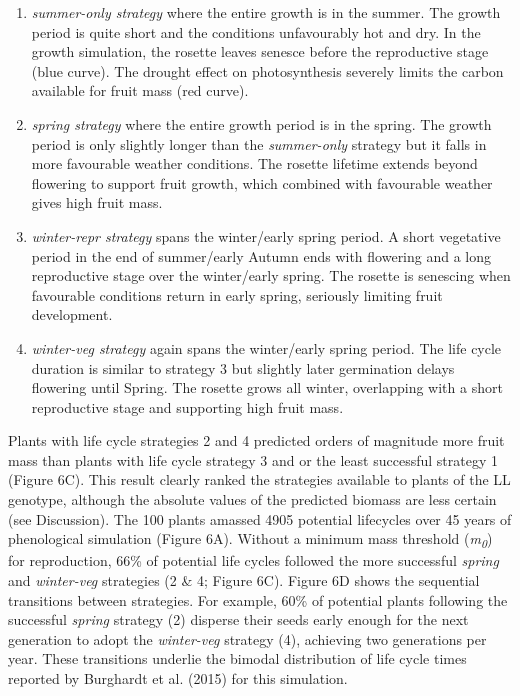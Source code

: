 \documentclass[phd]{infthesis}
\begin{document}
\begin{enumerate}
\def\labelenumi{\arabic{enumi}.}
\item
  \emph{summer-only strategy} where the entire growth is in the summer.
  The growth period is quite short and the conditions unfavourably hot
  and dry. In the growth simulation, the rosette leaves senesce before
  the reproductive stage (blue curve). The drought effect on
  photosynthesis severely limits the carbon available for fruit mass
  (red curve).
\item
  \emph{spring strategy} where the entire growth period is in the
  spring. The growth period is only slightly longer than the
  \emph{summer-only} strategy but it falls in more favourable weather
  conditions. The rosette lifetime extends beyond flowering to support
  fruit growth, which combined with favourable weather gives high fruit
  mass.
\item
  \emph{winter-repr strategy} spans the winter/early spring period. A
  short vegetative period in the end of summer/early Autumn ends with
  flowering and a long reproductive stage over the winter/early spring.
  The rosette is senescing when favourable conditions return in early
  spring, seriously limiting fruit development.
\item
  \emph{winter-veg strategy} again spans the winter/early spring period.
  The life cycle duration is similar to strategy 3 but slightly later
  germination delays flowering until Spring. The rosette grows all
  winter, overlapping with a short reproductive stage and supporting
  high fruit mass.
\end{enumerate}

Plants with life cycle strategies 2 and 4 predicted orders of magnitude
more fruit mass than plants with life cycle strategy 3 and or the least
successful strategy 1 (Figure 6C). This result clearly ranked the
strategies available to plants of the LL genotype, although the absolute
values of the predicted biomass are less certain (see Discussion). The
100 plants amassed 4905 potential lifecycles over 45 years of
phenological simulation (Figure 6A). Without a minimum mass threshold
(\emph{m\textsubscript{0}}) for reproduction, 66\% of potential life
cycles followed the more successful \emph{spring} and \emph{winter-veg}
strategies (2 \& 4; Figure 6C). Figure 6D shows the sequential
transitions between strategies. For example, 60\% of potential plants
following the successful \emph{spring} strategy (2) disperse their seeds
early enough for the next generation to adopt the \emph{winter-veg}
strategy (4), achieving two generations per year. These transitions
underlie the bimodal distribution of life cycle times reported by
Burghardt et al. (2015) for this simulation.
\end{document}
